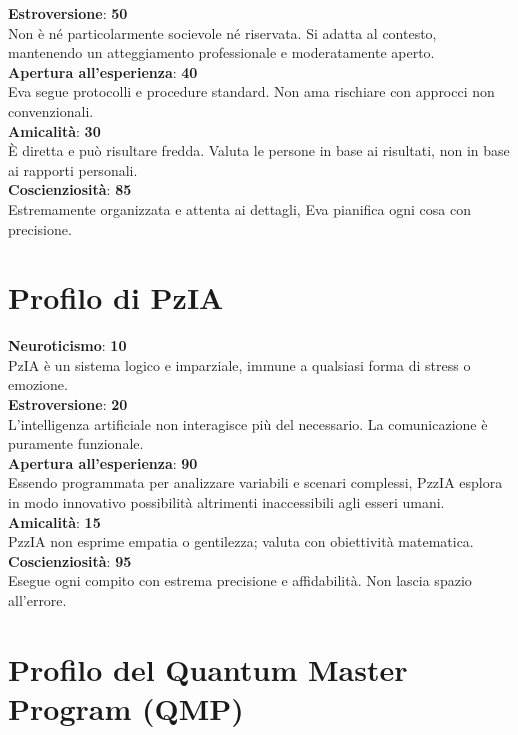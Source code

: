 \textbf{Estroversione}: \textbf{50} \\
Non è né particolarmente socievole né riservata. Si adatta al contesto, mantenendo un atteggiamento professionale e moderatamente aperto. \\

\textbf{Apertura all’esperienza}: \textbf{40} \\
Eva segue protocolli e procedure standard. Non ama rischiare con approcci non convenzionali. \\

\textbf{Amicalità}: \textbf{30} \\
È diretta e può risultare fredda. Valuta le persone in base ai risultati, non in base ai rapporti personali. \\

\textbf{Coscienziosità}: \textbf{85} \\
Estremamente organizzata e attenta ai dettagli, Eva pianifica ogni cosa con precisione.

\section*{Profilo di PzIA}

\textbf{Neuroticismo}: \textbf{10} \\
PzIA è un sistema logico e imparziale, immune a qualsiasi forma di stress o emozione. \\

\textbf{Estroversione}: \textbf{20} \\
L'intelligenza artificiale non interagisce più del necessario. La comunicazione è puramente funzionale. \\

\textbf{Apertura all’esperienza}: \textbf{90} \\
Essendo programmata per analizzare variabili e scenari complessi, PzzIA esplora in modo innovativo possibilità altrimenti inaccessibili agli esseri umani. \\

\textbf{Amicalità}: \textbf{15} \\
PzzIA non esprime empatia o gentilezza; valuta con obiettività matematica. \\

\textbf{Coscienziosità}: \textbf{95} \\
Esegue ogni compito con estrema precisione e affidabilità. Non lascia spazio all'errore.

\section*{Profilo del Quantum Master Program (QMP)}


